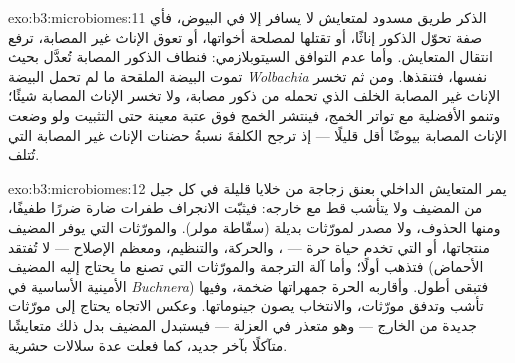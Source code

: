 \begin{solution}{exo:b3:microbiomes:11}
الذكر طريق مسدود لمتعايش لا يسافر إلا في البيوض، فأي صفة
تحوّل الذكور إناثًا، أو تقتلها لمصلحة أخواتها، أو تعوق
الإناث غير المصابة، ترفع انتقال المتعايش. وأما عدم التوافق
السيتوبلازمي: فنطاف الذكور المصابة تُعدَّل بحيث تموت
البيضة الملقحة ما لم تحمل البيضة \emph{Wolbachia} نفسها،
فتنقذها. ومن ثم تخسر الإناث غير المصابة الخلف الذي تحمله
من ذكور مصابة، ولا تخسر الإناث المصابة شيئًا؛ وتنمو
الأفضلية مع تواتر الخمج، فينتشر الخمج فوق عتبة معينة حتى
التثبيت ولو وضعت الإناث المصابة بيوضًا أقل قليلًا --- إذ
ترجح الكلفةَ نسبةُ حضنات الإناث غير المصابة التي تُتلف.
\end{solution}

\begin{solution}{exo:b3:microbiomes:12}
يمر المتعايش الداخلي بعنق زجاجة من خلايا قليلة في كل جيل
من المضيف ولا يتأشب قط مع خارجه: فيثبّت الانجراف طفرات
ضارة ضررًا طفيفًا، ومنها الحذوف، ولا مصدر لمورّثات بديلة
(سقّاطة مولر). والمورّثات التي يوفر المضيف منتجاتها، أو
التي تخدم حياة حرة --- ، والحركة، والتنظيم، ومعظم
الإصلاح --- لا تُفتقد فتذهب أولًا؛ وأما آلة الترجمة
والمورّثات التي تصنع ما يحتاج إليه المضيف (الأحماض
الأمينية الأساسية في \emph{Buchnera}) فتبقى أطول. وأقاربه
الحرة جمهراتها ضخمة، وفيها تأشب وتدفق مورّثات، والانتخاب
يصون جينوماتها. وعكس الاتجاه يحتاج إلى مورّثات جديدة من
الخارج --- وهو متعذر في العزلة --- فيستبدل المضيف بدل ذلك
متعايشًا متآكلًا بآخر جديد، كما فعلت عدة سلالات حشرية.
\end{solution}

